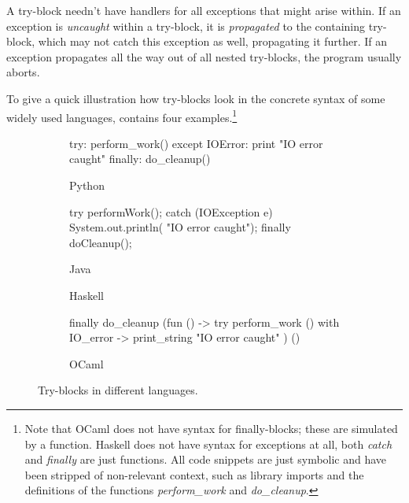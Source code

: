 A try-block needn't have handlers for all exceptions that might arise within. If an exception
is \emph{uncaught} within a try-block, it is \emph{propagated} to the containing try-block,
which may not catch this exception as well, propagating it further.
If an exception propagates all the way out of all nested try-blocks, the program usually
aborts.

To give a quick illustration how try-blocks look in the concrete syntax of some widely used
languages,  contains four examples.\footnote{Note that OCaml does not
have syntax for finally-blocks; these are simulated by a function. Haskell does not have
syntax for exceptions at all, both \emph{catch} and \emph{finally} are just functions.
All code snippets are just symbolic and have been stripped of non-relevant context, such
as library imports and the definitions of the functions \emph{perform\_work}
and \emph{do\_cleanup}.}

\begin{figure}[htp]
\centering
%
\begin{subfigure}[b]{0.46\textwidth}\begin{codepy}
try:
	perform_work()
except IOError:
	print "IO error caught"
finally:
	do_cleanup()
\end{codepy}\caption{Python}\end{subfigure}
%
\begin{subfigure}[b]{0.46\textwidth}\begin{codejava}
try {
	performWork();
} catch (IOException e) {
	System.out.println(
	    "IO error caught");
} finally {
	doCleanup();
}
\end{codejava}\caption{Java}\end{subfigure}

\begin{subfigure}[b]{0.46\textwidth}\caption{Haskell}\end{subfigure}
%
\begin{subfigure}[b]{0.46\textwidth}\begin{codeml}
finally do_cleanup (fun () ->
  try perform_work ()
  with IO_error ->
    print_string "IO error caught"
) ()
\end{codeml}\caption{OCaml}\end{subfigure}
\caption{Try-blocks in different languages.}
\label{fig:try-blocks}
\end{figure}

